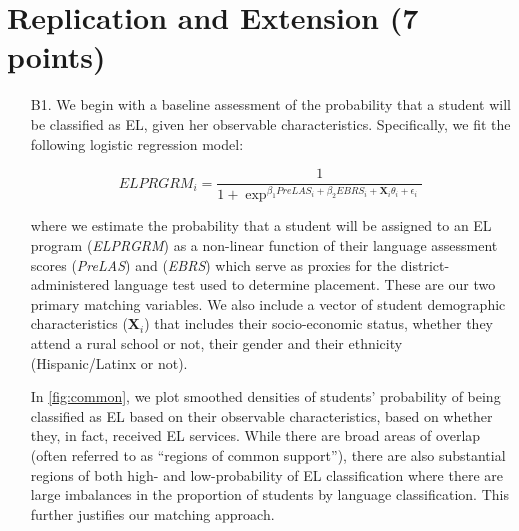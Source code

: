 \documentclass[a4paper, 11pt]{article}
\begin{document}
\begin{enumerate}


\end{enumerate}
\pagebreak

\section{Replication and Extension (7 points)}

\begin{enumerate}
	\item[B1.] We begin with a baseline assessment of the probability that a student will be classified as EL, given her observable characteristics. Specifically, we fit the following logistic regression model:

\begin{equation}
	ELPRGRM_{i}= \frac{1}{1+\exp^{\beta_{1}PreLAS_{i} + \beta_{2}EBRS_{i} + \textbf{X}_i\theta_{i} + \epsilon_{i}}}
\end{equation}


	where we estimate the probability that a student will be assigned to an EL program (\textit{ELPRGRM}) as a non-linear function of their language assessment scores (\textit{PreLAS}) and (\textit{EBRS}) which serve as proxies for the district-administered language test used to determine placement. These are our two primary matching variables. We also include a vector of student demographic characteristics (\textbf{X$_{i}$}) that includes their socio-economic status, whether they attend a rural school or not, their gender and their ethnicity (Hispanic/Latinx or not). 

	In \autoref{fig:common}, we plot smoothed densities of students' probability of being classified as EL based on their observable characteristics, based on whether they, in fact, received EL services. While there are broad areas of overlap (often referred to as ``regions of common support''), there are also substantial regions of both high- and low-probability of EL classification where there are large imbalances in the proportion of students by language classification. This further justifies our matching approach.


\end{enumerate}
\end{document}
